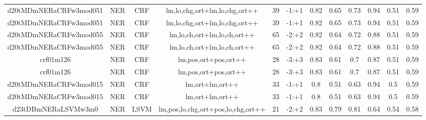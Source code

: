 \documentclass[a4paper]{article}
\begin{document}
\begin{landscape}
\begin{center}
\begin{tabular}{ |c|c|c|c|c|c|c|c|c|c|c|c|}
 
 	
 	\small{ d20tMDmNERaCRFw3mod051 } & \small{ NER} & \small{  CRF }  & lm,lo,chg,ort+lm,lo,chg,ort++  &  39 &  \small{  -1:+1 }  &  0.82 & 0.65 & 0.73  &  0.94 & 0.51 & 0.59 \\
 	

 
 	
 	\small{ d20tMDmNERaCRFw3mod051 } & \small{ NER} & \small{  CRF }  & lm,lo,chg,ort+lm,lo,chg,ort++  &  39 &  \small{  -1:+1 }  &  0.82 & 0.65 & 0.73  &  0.94 & 0.51 & 0.59 \\
 	

 
 	
 	\small{ d20tMDmNERaCRFw3mod055 } & \small{ NER} & \small{  CRF }  & lm,lo,ch,ort+lm,lo,ch,ort++  &  65 &  \small{  -2:+2 }  &  0.82 & 0.64 & 0.72  &  0.88 & 0.51 & 0.59 \\
 	

 
 	
 	\small{ d20tMDmNERaCRFw3mod055 } & \small{ NER} & \small{  CRF }  & lm,lo,ch,ort+lm,lo,ch,ort++  &  65 &  \small{  -2:+2 }  &  0.82 & 0.64 & 0.72  &  0.88 & 0.51 & 0.59 \\
 	

 
 	
 	\small{ crf01m126 } & \small{ NER} & \small{  CRF }  & lm,pos,ort+pos,ort++  &  28 &  \small{  -3:+3 }  &  0.83 & 0.61 & 0.7  &  0.87 & 0.51 & 0.59 \\
 	

 
 	
 	\small{ crf01m126 } & \small{ NER} & \small{  CRF }  & lm,pos,ort+pos,ort++  &  28 &  \small{  -3:+3 }  &  0.83 & 0.61 & 0.7  &  0.87 & 0.51 & 0.59 \\
 	

 
 	
 	\small{ d20tMDmNERaCRFw3mod015 } & \small{ NER} & \small{  CRF }  & lm,ort+lm,ort++  &  33 &  \small{  -1:+1 }  &  0.8 & 0.51 & 0.63  &  0.94 & 0.5 & 0.59 \\
 	

 
 	
 	\small{ d20tMDmNERaCRFw3mod015 } & \small{ NER} & \small{  CRF }  & lm,ort+lm,ort++  &  33 &  \small{  -1:+1 }  &  0.8 & 0.51 & 0.63  &  0.94 & 0.5 & 0.59 \\
 	

 
 	
 	\small{ d23tDBmNERaLSVMw3m0 } & \small{ NER} & \small{  LSVM }  & lm,pos,lo,chg,ort+pos,lo,chg,ort++  &  21 &  \small{  -2:+2 }  &  0.83 & 0.79 & 0.81  &  0.64 & 0.54 & 0.58 \\
 	


\end{tabular}
\end{center}
\end{landscape}
\end{document}
